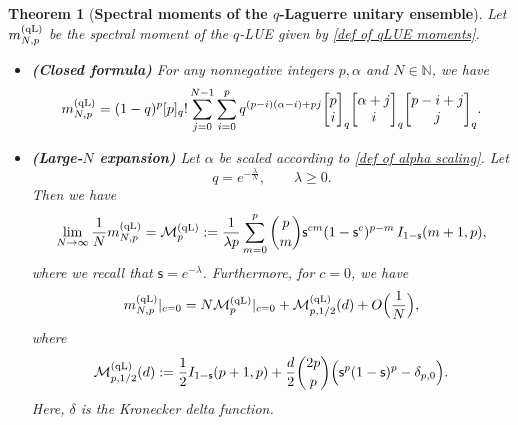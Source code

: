 \documentclass{amsart}
\newcommand{\qbinom}[2]{{\begin{bmatrix}#1\\#2\end{bmatrix}}_q}
\theoremstyle{plain}
\newtheorem{thm}{Theorem}[section]
\theoremstyle{remark}
\numberwithin{equation}{section}
\begin{document}
\begin{thm}[\textbf{Spectral moments of the $q$-Laguerre unitary ensemble}] \label{Thm:Spectralmoment} Let $ {m}_{N,p}^{\rm (qL)}$ be the spectral moment of the $q$-LUE given by \eqref{def of qLUE moments}. 
\begin{itemize}
    \item[\textup{(A)}] \textup{\textbf{(Closed formula)}} For any nonnegative integers $p,\alpha$ and $N \in \mathbb{N}$, we have  
    \begin{equation}  \label{eqn:m}
  {m}_{N,p}^{\rm (qL)} = (1-q)^{p} [p]_q! \sum_{j=0}^{N-1}\sum_{i=0}^{p} q^{ (p-i)(\alpha-i)+pj }  \qbinom{p}{i} \qbinom{\alpha+j}{i} \qbinom{p-i+j}{j}. 
\end{equation}  
    \item[\textup{(B)}] \textup{\textbf{(Large-$N$ expansion)}}  Let $\alpha$ be scaled according to \eqref{def of alpha scaling}. Let 
    \begin{equation}\label{eqn:q scale}
    q=e^{-\frac{\lambda}{N}},\qquad \lambda\geq0.
\end{equation} 
Then we have 
\begin{equation} \label{def of leading order moment}
\lim_{N \to \infty} \frac{ 1 }{N}m_{N,p}^{(\mathrm{qL})} = \mathcal{M}_{p}^{ \rm (qL) } :=  \frac{1}{\lambda p}
\sum_{m=0}^p  \binom{p}{m} \mathsf{s}^{c m}  (1-\mathsf{s}^c)^{p-m}\,
I_{1-\mathsf{s}}(m+1,p),
\end{equation} 
where we recall that $\mathsf{s}=e^{-\lambda}$. Furthermore, for $c=0$, we have 
\begin{equation} \label{qLUE moment expansion c0}
m_{N,p}^{(\mathrm{qL})}|_{c=0}= N \mathcal{M}_{p}^{ \rm (qL) }|_{c=0} + \mathcal{M}_{p,1/2}^{ \rm (qL) }(d) +O\Big(\frac{1}{N}\Big), 
\end{equation}
where  
\begin{equation} \label{def of subleading term qLUE moment}
  \mathcal{M}_{p,1/2}^{ \rm (qL) }(d) := \frac12 I_{1- \mathsf{s} }(p+1,p)+\frac{d}{2}  \binom{2p}{p} \Big(  \mathsf{s}^p (1-\mathsf{s})^{p} - \delta_{p,0} \Big).  
\end{equation}
Here, $\delta$ is the Kronecker delta function.  
\end{itemize}
\end{thm}
\end{document}
